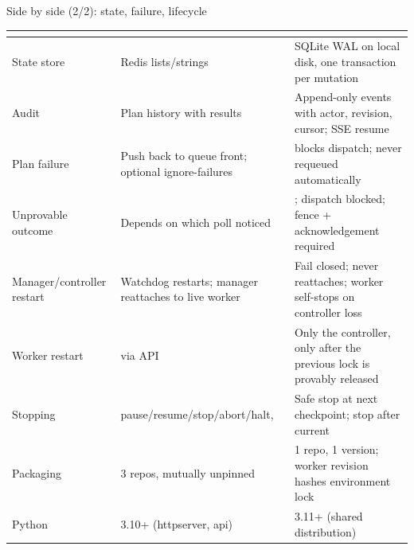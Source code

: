 \begin{frame}{Side by side (2/2): state, failure, lifecycle}
    \footnotesize
    \renewcommand{\arraystretch}{1.35}
    \begin{tabular}{@{}L{2.7cm}L{5.4cm}L{5.4cm}@{}}
        \toprule
        & \textbf{\color{qsamber}\legacy{}} & \textbf{\color{qsnavy}\vtwo{}} \\
        \midrule
        State store & Redis lists/strings & SQLite WAL on local disk, one transaction per mutation \\
        Audit & Plan history with results & Append-only events with actor, revision, cursor; SSE resume \\
        Plan failure & Push back to queue front; optional ignore-failures &  blocks dispatch; never requeued automatically \\
        Unprovable outcome & Depends on which poll noticed & ; dispatch blocked; fence + acknowledgement required \\
        Manager/controller restart & Watchdog restarts; manager reattaches to live worker & Fail closed; never reattaches; worker self-stops on controller loss \\
        Worker restart &  via API & Only the controller, only after the previous lock is provably released \\
        Stopping & pause/resume/stop/abort/halt,  & Safe stop at next checkpoint; stop after current \\
        Packaging & 3 repos, mutually unpinned & 1 repo, 1 version; worker revision hashes environment lock \\
        Python & 3.10+ (httpserver, api) & 3.11+ (shared distribution) \\
        \bottomrule
    \end{tabular}
\end{frame}

